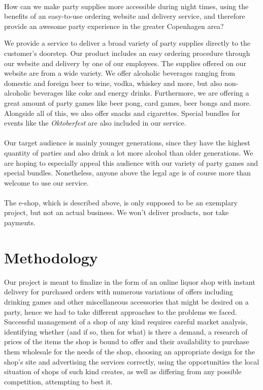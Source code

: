 \documentclass[12p]{article}
\begin{document}
\begin{center}
    \vspace{1em}
    \SlimHRule\\[0.1cm]
    \Large{How can we make party supplies more accessible during night times, using the benefits of an easy-to-use ordering website and delivery service, and therefore provide an awesome party experience in the greater Copenhagen area?}
    \SlimHRule\\[0.1cm]
    \vspace{1em}
\end{center}

We provide a service to deliver a broad variety of party supplies directly to the customer's doorstep. Our product includes an easy ordering procedure through our website and delivery by one of our employees. The supplies offered on our website are from a wide variety. We offer alcoholic beverages ranging from domestic and foreign beer to wine, vodka, whiskey and more, but also non-alcoholic beverages like coke and energy drinks. Furthermore, we are offering a great amount of party games like beer pong, card games, beer bongs and more. Alongside all of this, we also offer snacks and cigarettes. Special bundles for events like the \emph{Oktoberfest} are also included in our service.
\\ \\
Our target audience is mainly younger generations, since they have the highest quantity of parties and also drink a lot more alcohol than older generations. We are hoping to especially appeal this audience with our variety of party games and special bundles. Nonetheless, anyone above the legal age is of course more than welcome to use our service.
\\ \\
The e-shop, which is described above, is only supposed to be an exemplary project, but not an actual business. We won't deliver products, nor take payments.


\newpage
\section{Methodology} \label{Methodology}
Our project is meant to finalize in the form of an online liquor shop with instant delivery for purchased orders with numerous variations of offers including drinking games and other miscellaneous accessories that might be desired on a party, hence we had to take different approaches to the problems we faced. Successful management of a shop of any kind requires careful market analysis, identifying whether (and if so, then for what) is there a demand, a research of prices of the items the shop is bound to offer and their availability to purchase them wholesale for the needs of the shop, choosing an appropriate design for the shop’s site and advertising the services correctly, using the opportunities the local situation of shops of such kind creates, as well as differing from any possible competition, attempting to best it. 
\end{document}

